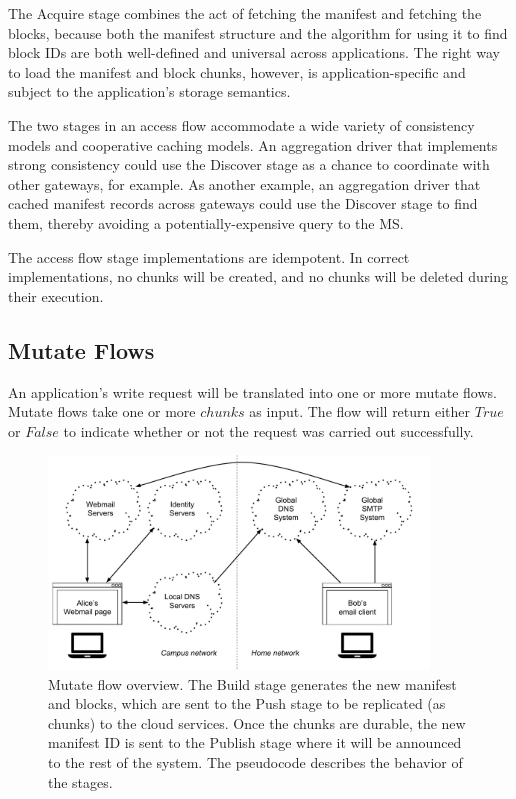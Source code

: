 The Acquire stage combines the act of fetching the manifest and fetching the
blocks, because both the manifest structure and the algorithm for using it to
find block IDs are both well-defined and universal across applications.  The 
right way to load the manifest and block chunks, however, is
application-specific and subject to the application's storage semantics.

The two stages in an access flow accommodate a wide
variety of consistency models and cooperative caching models.  An
aggregation driver that implements strong consistency could use the Discover
stage as a chance to coordinate with other gateways, for example.  As
another example, an aggregation driver that cached manifest records
across gateways could use the Discover stage to find them, thereby avoiding a
potentially-expensive query to the MS.

The access flow stage implementations are idempotent.  In correct
implementations, no chunks will be created, and no chunks will be deleted
during their execution.

\subsection{Mutate Flows}

An application's write request will be translated into one or more mutate flows.
Mutate flows take one or more $chunks$ as input.  The flow will return
either $True$ or $False$ to indicate whether or not the request was
carried out successfully.

\begin{figure}[h]
   \centering
   \includegraphics[width=0.9\textwidth,page=8]{figures/dissertation-figures}
   \caption{Mutate flow overview.  The Build stage generates the new manifest
   and blocks, which are sent to the Push stage to be replicated (as chunks) to
   the cloud services.  Once the chunks are durable, the new manifest ID is
   sent to the Publish stage where it will be announced to the rest of the
   system.  The pseudocode describes the behavior of the stages.}
   \label{fig:chap2-mutate-flow}
\end{figure}

